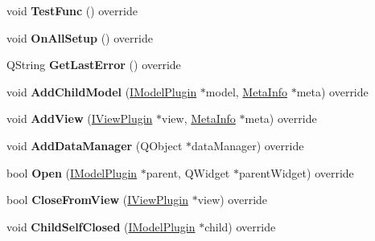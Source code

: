 \begin{DoxyCompactItemize}
\mbox{\label{class_neural_network_model_a81bbe391734aa26a7fa316dcbea0ea86}} 
void {\bfseries Test\+Func} () override
\item 
\mbox{\label{class_neural_network_model_ae10c5a6387aa0752663d4c0ee07ed5ca}} 
void {\bfseries On\+All\+Setup} () override
\item 
\mbox{\label{class_neural_network_model_ab9c3d8c5d6ae87dc0ed6e0650e614eb3}} 
Q\+String {\bfseries Get\+Last\+Error} () override
\item 
\mbox{\label{class_neural_network_model_a76c4f2032b0bc283e59efcf90617ca45}} 
void {\bfseries Add\+Child\+Model} (\hyperlink{class_i_model_plugin}{I\+Model\+Plugin} $\ast$model, \hyperlink{struct_meta_info}{Meta\+Info} $\ast$meta) override
\item 
\mbox{\label{class_neural_network_model_ab819ce176d4dd2d2709b4db3304db5ef}} 
void {\bfseries Add\+View} (\hyperlink{class_i_view_plugin}{I\+View\+Plugin} $\ast$view, \hyperlink{struct_meta_info}{Meta\+Info} $\ast$meta) override
\item 
\mbox{\label{class_neural_network_model_ad20c25a3b27c40fbb448997adbf35e72}} 
void {\bfseries Add\+Data\+Manager} (Q\+Object $\ast$data\+Manager) override
\item 
\mbox{\label{class_neural_network_model_ac6fcccae5d54c0fd16bc5e645dff04b7}} 
bool {\bfseries Open} (\hyperlink{class_i_model_plugin}{I\+Model\+Plugin} $\ast$parent, Q\+Widget $\ast$parent\+Widget) override
\item 
\mbox{\label{class_neural_network_model_ac66bbc3e734af35989a83ff95d45d894}} 
bool {\bfseries Close\+From\+View} (\hyperlink{class_i_view_plugin}{I\+View\+Plugin} $\ast$view) override
\item 
\mbox{\label{class_neural_network_model_aed4269880cfc1c385e5904b1f415580b}} 
void {\bfseries Child\+Self\+Closed} (\hyperlink{class_i_model_plugin}{I\+Model\+Plugin} $\ast$child) override

\end{DoxyCompactItemize}
